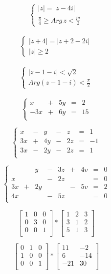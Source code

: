 \documentclass[12pt, letterpaper, titlepage]{article}
\begin{document}
$$\begin{cases}
|z|=|z-4i|\\
\frac{\pi}{4}\geq Arg \, z < \frac{pi}{2}
\end{cases}$$
\\
$$\begin{cases}
|z+4|=|z+2-2i|\\
|z|\geq 2
\end{cases}$$
\\
$$\begin{cases}
|z-1-i|<\sqrt{2}\\
Arg(z-1-i)<\frac{\pi}{2}
\end{cases}$$
\\
$$\left\{\begin{array}{rclcr}
x&+&5y &=&2\\
-3x&+&6y &=&15\\
\end{array} \right.$$

$$\left\{\begin{array}{rcrcrcr}
x&-&y&-&z&=&1\\
3x&+&4y&-&2z&=&-1\\
3x&-&2y&-&2z&=&1\\
\end{array} \right.$$

$$\left\{\begin{array}{rcrcccccc}
 & &y&-&3z&+&4v&=&0\\
x& & &-&2z& & &=&0\\
3x&+&2y& & &-&5v&=&2\\
4x& & &-&5z& & &=&0\\
\end{array} \right.$$

$$\mathbf{}
\left[\begin{array}{ccc}
1&0&0\\
0&3&0\\
0&0&1\\
\end{array} \right]
*
\mathbf{}
\left[\begin{array}{ccc}
1&2&3\\
3&1&2\\
5&1&3\\
\end{array} \right]$$

$$
\mathbf{}
\left[\begin{array}{ccc}
0&1&0\\
1&0&0\\
0&0&1\\
\end{array} \right]
*
\mathbf{}
\left[\begin{array}{cc}
11&-2\\
6&-14\\
-21&30\\
\end{array} \right]
$$
\end{document}
